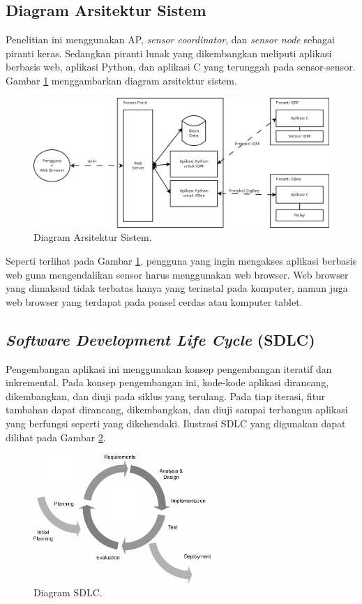 		\subsection{Diagram Arsitektur Sistem}
			Penelitian ini menggunakan AP, \emph{sensor coordinator}, dan \emph{sensor node} sebagai piranti keras. Sedangkan piranti lunak yang dikembangkan meliputi aplikasi berbasis web, aplikasi Python, dan aplikasi C yang terunggah pada sensor-sensor. Gambar \ref{system-architecture} menggambarkan diagram arsitektur sistem.
			
			\begin{figure}[H]
			  \centering
			    \includegraphics[width=\textwidth]{gambar/system-architecture}
			    \caption{Diagram Arsitektur Sistem.}
			    \label{system-architecture}
			\end{figure}

			Seperti terlihat pada Gambar \ref{system-architecture}, pengguna yang ingin mengakses aplikasi berbasis web guna mengendalikan sensor harus menggunakan web browser. Web browser yang dimaksud tidak terbatas hanya yang terinstal pada komputer, namun juga web browser yang terdapat pada ponsel cerdas atau komputer tablet.

		\subsection{\emph{Software Development Life Cycle} (SDLC)}
			Pengembangan aplikasi ini menggunakan konsep pengembangan iteratif dan inkremental. Pada konsep pengembangan ini, kode-kode aplikasi dirancang, dikembangkan, dan diuji pada siklus yang terulang. Pada tiap iterasi, fitur tambahan dapat dirancang, dikembangkan, dan diuji sampai terbangun aplikasi yang berfungsi seperti yang dikehendaki. Ilustrasi SDLC yang digunakan dapat dilihat pada Gambar \ref{sdlc}.

			\begin{figure}[H]
			  \centering
			    \includegraphics[width=0.6\textwidth]{gambar/sdlc}
			    \caption{Diagram SDLC.}
			    \label{sdlc}
			\end{figure}

